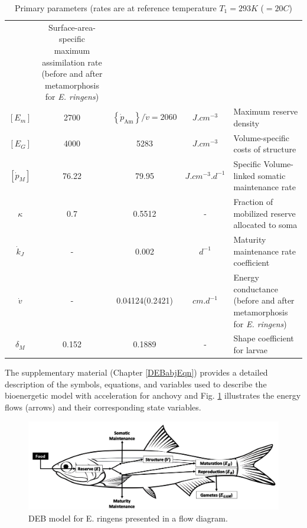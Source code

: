 \begin{table}[H]
\begin{adjustbox}{width=1.2\textwidth}
\begin{tabular}{c|c|c|c|l}
	& \makecell[l]{Surface-area-specific maximum assimilation rate \\ (before and after metamorphosis for \textit{E. ringens})} \\
$\left[ E_{m} \right]$ 
	& 2700
	& $\left \{ \dot{p}_\mathrm{Am} \right \}/\dot{v}=2060$
	& $J.cm^{-3}$ & Maximum reserve density\\
$\left[ E_{G} \right]$
	& 4000
	& 5283
	& $J.cm^{-3}$ & Volume-specific costs of structure\\
$\left [ \dot{p}_{M} \right ]$
	& 76.22
	& 79.95
	& $J.cm^{-3}.d^{-1}$
	& Specific Volume-linked somatic maintenance rate\\
$\kappa$
	& 0.7 
	& 0.5512 
	& - 
	& Fraction of mobilized reserve allocated to soma\\
$\dot{k}_{J}$ & - & 0.002 	        & $d^{-1}$     & Maturity maintenance rate coefficient\\
$\dot{v}$
	& - & 0.04124(0.2421)
	& $cm. d^{-1}$ 
	& \makecell[l]{Energy conductance \\ (before and after metamorphosis for \textit{E. ringens})}\\
$\delta_{M}$
	& 0.152
	& 0.1889
	& -
	& Shape coefficient for larvae\\
\end{tabular}
\end{adjustbox}
\caption{Primary parameters (rates are at reference temperature $T_{1} = 293 K$  ($=20$\textdegree $C$)}
\label{param_compar}
\end{table}

The supplementary material (Chapter \ref{DEBabjEqn}) provides a detailed description of the symbols, equations, and variables used to describe the bioenergetic model with acceleration for anchovy and Fig. \ref{Chap4_ringens_DEB} illustrates the energy flows (arrows) and their corresponding state variables.\\

\begin{figure}[H]
	\includegraphics[width=1.0\textwidth]{figures/Chap4_ringens_DEB.png}
	\centering
	\caption{DEB model for E. ringens presented in a flow diagram.}
	\label{Chap4_ringens_DEB}
\end{figure}

